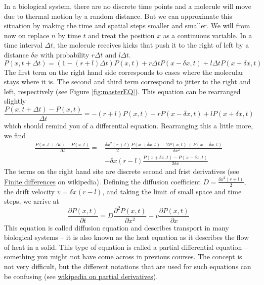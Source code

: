 In a biological system, there are no discrete time points and a molecule will move due to thermal motion by a random distance.
But we can approximate this situation by making the time and spatial steps smaller and smaller.
We will from now on replace $n$ by time $t$ and treat the position $x$ as a continuous variable.
In a time interval $\Delta t$, the molecule receives kicks that push it to the right of left by a distance $\delta x$ with probability $r\Delta t$ and $l\Delta t$.
\begin{equation}
	P(x,t+\Delta t) = (1-(r+l)\Delta t) P(x,t) + r\Delta t P(x-\delta x, t) + l\Delta t P(x+\delta x,t)
\end{equation}
The first term on the right hand side corresponds to cases where the molecular stays where it is.
The second and third term correspond to jitter to the right and left, respectively (see Figure \ref{fig:masterEQ}).
This equation can be rearranged slightly
\begin{equation}
	\frac{P(x,t+\Delta t) - P(x,t)}{\Delta t} = -(r+l) P(x,t) + r P(x-\delta x, t) + l P(x+\delta x,t)
\end{equation}
which should remind you of a differential equation.
Rearranging this a little more, we find
\begin{equation}
\begin{split}
	\label{eq:discrete_update}
	\frac{P(x,t+\Delta t) - P(x,t)}{\Delta t} = &\frac{\delta x^2(r+l)}{2} \frac{P(x+\delta x,t) - 2 P(x,t) +P(x-\delta x, t)}{\delta x^2}\\&
	 - \delta x (r-l) \frac{P(x+\delta x, t) - P(x-\delta x,t)}{2\delta x}
\end{split}
\end{equation}
The terms on the right hand site are discrete second and frist derivatives (see \href{https://en.wikipedia.org/wiki/Finite_difference}{Finite differences} on wikipedia).
Defining the diffusion coefficient $D=\frac{\delta x^2 (r+l)}{2}$, the drift velocity $v=\delta x (r-l)$, and taking the limit of small space and time steps, we arrive at
\begin{equation}
\label{eq:diffusion}
	\frac{\partial P(x,t)}{\partial t} = D\frac{\partial^2 P(x,t)}{\partial x^2} - v \frac{\partial P(x,t)}{\partial x}
\end{equation}
This equation is called diffusion equation and describes transport in many biological systems -- it is also known as the heat equation as it describes the flow of heat in a solid.
This type of equation is called a partial differential equation -- something you might not have come across in previous courses.
The concept is not very difficult, but the different notations that are used for such equations can be confusing (see \href{https://en.wikipedia.org/wiki/Partial_derivative}{wikipedia on partial derivatives}).

